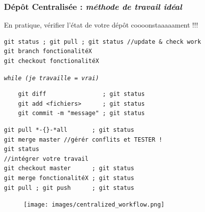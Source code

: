 \documentclass[table,tikz,12pt,svgnames]{beamer}
\begin{document}

\begin{frame}[fragile]
\frametitle{Dépôt Centralisée :\textit{ méthode de travail \textbf{idéal}}}
\begin{adjustwidth}{-1em}{0cm}{}
\vspace{-3.5em}
\color{darkgreen}%
En pratique, vérifier l'état de votre dépôt coooonstaaaaament !!! \\
\color{black}
\vspace{-1.5em}
\begin{verbatim}
git status ; git pull ; git status //update & check work
git branch fonctionalitéX
git checkout fonctionalitéX
\end{verbatim}

\vspace{-0.5em}
\textit{\texttt{while (je travaille = vrai) }} %
\vspace{-1em}
\begin{verbatim}
	git diff                ; git status
	git add <fichiers>      ; git status
	git commit -m "message" ; git status
\end{verbatim}
\vspace{-2.5em}
\begin{verbatim}
git pull *-{}-*all       ; git status
git merge master //gérér conflits et TESTER !
git status
//intégrer votre travail
git checkout master      ; git status
git merge fonctionalitéX ; git status
git pull ; git push      ; git status
\end{verbatim}
\end{adjustwidth}
\vspace{-12em}
\begin{adjustwidth}{-0cm}{-1cm}{}
	\begin{figure}
		\hfill
		\texttt{[image: images/centralized\_workflow.png]}
	\end{figure}
\end{adjustwidth}
\end{frame}
\end{document}
